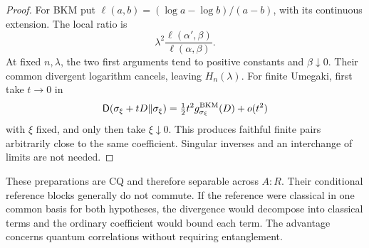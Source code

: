 \documentclass[11pt]{article}
\theoremstyle{remark}\newtheorem{remark}[theorem]{Remark}
\newcommand{\D}{\mathsf D}
\begin{document}
\begin{proof}
For BKM put $\ell(a,b)=(\log a-\log b)/(a-b)$, with its continuous extension. The local ratio is
\[
 \lambda^2\frac{\ell(\alpha',\beta)}{\ell(\alpha,\beta)}.
\]
At fixed $n,\lambda$, the two first arguments tend to positive constants and $\beta\downarrow0$. Their common divergent logarithm cancels, leaving $H_n(\lambda)$. For finite Umegaki, first take $t\to0$ in
\[
 \D(\sigma_\xi+tD\Vert\sigma_\xi)
 =\tfrac12t^2g^{\rm BKM}_{\sigma_\xi}(D)+o(t^2)
\]
with $\xi$ fixed, and only then take $\xi\downarrow0$. This produces faithful finite pairs arbitrarily close to the same coefficient. Singular inverses and an interchange of limits are not needed.
\end{proof}

These preparations are CQ and therefore separable across $A:R$. Their conditional reference blocks generally do not commute. If the reference were classical in one common basis for both hypotheses, the divergence would decompose into classical terms and the ordinary coefficient would bound each term. The advantage concerns quantum correlations without requiring entanglement.
\end{document}
